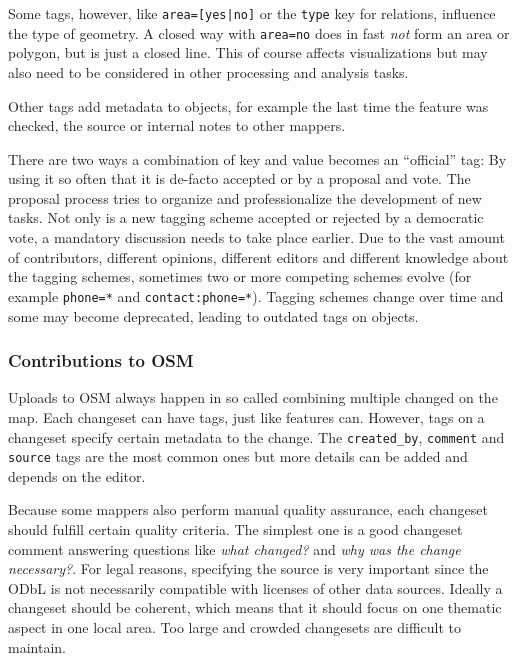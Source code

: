 			Some tags, however, like \texttt{area=[yes|no]} or the \texttt{type} key for relations, influence the type of geometry.
			A closed way with \texttt{area=no} does in fast \textit{not} form an area or polygon, but is just a closed line.
			This of course affects visualizations but may also need to be considered in other processing and analysis tasks.
			
			Other tags add metadata to objects, for example the last time the feature was checked, the source or internal notes to other mappers.
			
			There are two ways a combination of key and value becomes an \enquote{official} tag:
			By using it so often that it is de-facto accepted or by a proposal and vote.
			The proposal process tries to organize and professionalize the development of new tasks.
			Not only is a new tagging scheme accepted or rejected by a democratic vote, a mandatory discussion needs to take place earlier.
			Due to the vast amount of contributors, different opinions, different editors and different knowledge about the tagging schemes, sometimes two or more competing schemes evolve (for example \texttt{phone=*} and \texttt{contact:phone=*}).
			Tagging schemes change over time and some may become deprecated, leading to outdated tags on objects.
			
		\subsubsection{Contributions to OSM}
		
			Uploads to OSM always happen in so called  combining multiple changed on the map\cite{osm-wiki-changeset}.
			Each changeset can have tags, just like features can.
			However, tags on a changeset specify certain metadata to the change.
			The \texttt{created\_by}, \texttt{comment} and \texttt{source} tags are the most common ones but more details can be added and depends on the editor.
			
			Because some mappers also perform manual quality assurance, each changeset should fulfill certain quality criteria.
			The simplest one is a good changeset comment answering questions like \textit{what changed?} and \textit{why was the change necessary?}.
			For legal reasons, specifying the source is very important since the ODbL is not necessarily compatible with licenses of other data sources.
			Ideally a changeset should be coherent, which means that it should focus on one thematic aspect in one local area.
			Too large and crowded changesets are difficult to maintain.
			
